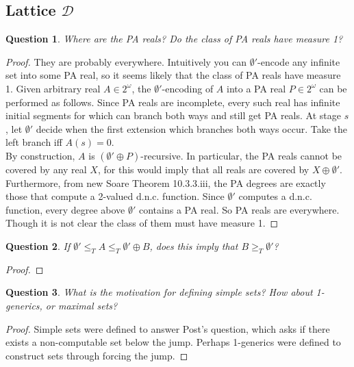 \documentclass{article}
\newtheorem{question}{Question}[subsection]
\begin{document}
  \subsection{Lattice $\mathcal{D}$}
    \begin{question}
      Where are the PA reals? Do the class of PA reals have measure 1?
    \end{question}
    \begin{proof}
      They are probably everywhere. Intuitively you can $\emptyset'$-encode
      any infinite set into some PA real, so it seems likely that the class
      of PA reals have measure 1. Given arbitrary real $A\in2^\omega$, the
      $\emptyset'$-encoding of $A$ into a PA real $P\in2^\omega$ can be
      performed as follows. Since PA reals are incomplete, every such real
      has infinite initial segments for which can branch both ways and
      still get PA reals. At stage $s$, let $\emptyset'$ decide when the
      first extension which branches both ways occur. Take the left branch
      iff $A(s)=0$. \\

      By construction, $A$ is $(\emptyset'\oplus P)$-recursive. In
      particular, the PA reals cannot be covered by any real $X$, for this
      would imply that all reals are covered by $X\oplus\emptyset'$.\\

      Furthermore, from new Soare Theorem 10.3.3.iii, the PA degrees are
      exactly those that compute a 2-valued d.n.c. function. Since
      $\emptyset'$ computes a d.n.c. function, every degree above
      $\emptyset'$ contains a PA real. So PA reals are everywhere. Though
      it is not clear the class of them must have measure 1.
    \end{proof}

    \begin{question}
      If $\emptyset' \leq_T A\leq_T \emptyset'\oplus B$, does this imply
      that $B\geq_T\emptyset'$?
    \end{question}
    \begin{proof}
    \end{proof}

    \begin{question}
      What is the motivation for defining simple sets? How about
      1-generics, or maximal sets?
    \end{question}
    \begin{proof}
      Simple sets were defined to answer Post's question, which asks if
      there exists a non-computable set below the jump. Perhaps 1-generics
      were defined to construct sets through forcing the jump.
    \end{proof}
\end{document}
